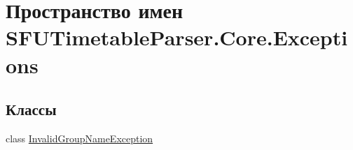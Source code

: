 \hypertarget{namespace_s_f_u_timetable_parser_1_1_core_1_1_exceptions}{}\section{Пространство имен S\+F\+U\+Timetable\+Parser.\+Core.\+Exceptions}
\label{namespace_s_f_u_timetable_parser_1_1_core_1_1_exceptions}
\subsection*{Классы}
\begin{DoxyCompactItemize}
\item 
class \hyperlink{class_s_f_u_timetable_parser_1_1_core_1_1_exceptions_1_1_invalid_group_name_exception}{Invalid\+Group\+Name\+Exception}
\end{DoxyCompactItemize}
